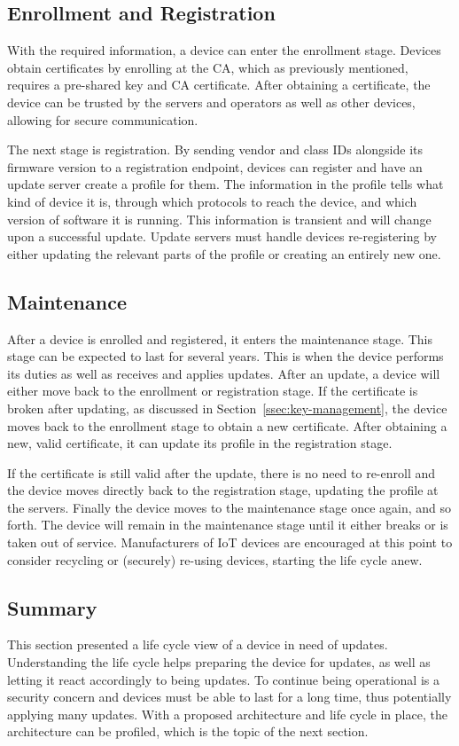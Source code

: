 \documentclass[0-thesis.tex]{subfiles}
\begin{document}
\subsection{Enrollment and Registration}
\label{ssec:enrollment-registration}
With the required information, a device can enter the enrollment stage. Devices obtain
certificates by enrolling at the CA, which as previously mentioned, requires a pre-shared
key and CA certificate. After obtaining a certificate, the device can be trusted by the
servers and operators as well as other devices, allowing for secure communication.

The next stage is registration. By sending vendor and class IDs alongside its firmware
version to a registration endpoint, devices can register and have an update server create
a profile for them. The information in the profile tells what kind of device it is,
through which protocols to reach the device, and which version of software it is running.
This information is transient and will change upon a successful update. Update servers
must handle devices re-registering by either updating the relevant parts of the profile or
creating an entirely new one.

\subsection{Maintenance}
\label{ssec:maintenance}
After a device is enrolled and registered, it enters the maintenance stage. This stage can
be expected to last for several years. This is when the device performs its duties as well
as receives and applies updates. After an update, a device will either move back to the
enrollment or registration stage. If the certificate is broken after updating, as
discussed in Section~\ref{ssec:key-management}, the device moves back to the enrollment
stage to obtain a new certificate. After obtaining a new, valid certificate, it can update
its profile in the registration stage. 

If the certificate is still valid after the update, there is no need to re-enroll and the
device moves directly back to the registration stage, updating the profile at the servers.
Finally the device moves to the maintenance stage once again, and so forth. The device
will remain in the maintenance stage until it either breaks or is taken out of service.
Manufacturers of IoT devices are encouraged at this point to consider recycling or
(securely) re-using devices, starting the life cycle anew.

\subsection{Summary}
\label{ssec:life-cycle-summary}
This section presented a life cycle view of a device in need of updates. Understanding the
life cycle helps preparing the device for updates, as well as letting it react accordingly
to being updates. To continue being operational is a security concern and devices must be
able to last for a long time, thus potentially applying many updates. With a proposed
architecture and life cycle in place, the architecture can be profiled, which is the topic
of the next section.
\end{document}
